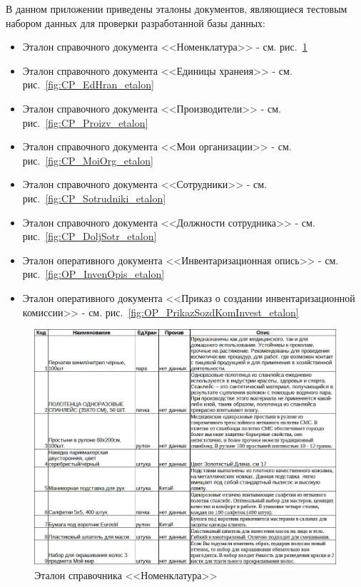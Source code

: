 \documentclass[12pt, a4paper, simple]{eskdtext}
\begin{document}
    

    \thispagestyle{plain}
    \pagestyle{plain}
    \hspace{0pt}

    В данном приложении приведены эталоны документов,
    являющиеся тестовым набором данных для проверки разработанной базы данных:

    \begin{itemize}
        \item Эталон справочного документа <<Номенклатура>> - см. рис.~\ref{fig:CP_Nomenclatura_etalon}
        \item Эталон справочного документа <<Единицы хранеия>> - см. рис.~\ref{fig:CP_EdHran_etalon}
        \item Эталон справочного документа <<Производители>> - см. рис.~\ref{fig:CP_Proizv_etalon}
        \item Эталон справочного документа <<Мои организации>> - см. рис.~\ref{fig:CP_MoiOrg_etalon}
        \item Эталон справочного документа <<Сотрудники>> - см. рис.~\ref{fig:CP_Sotrudniki_etalon}
        \item Эталон справочного документа <<Должности сотрудника>> - см. рис.~\ref{fig:CP_DoljSotr_etalon}
        \item Эталон оперативного документа <<Инвентаризационная опись>> - см. рис.~\ref{fig:OP_InvenOpis_etalon}
        \item Эталон оперативного документа <<Приказ о создании инвентаризационной комиссии>> - см. рис.~\ref{fig:OP_PrikazSozdKomInvest_etalon}
    \end{itemize}

    \begin{figure}[!h]
        \centering
        \includegraphics[width=18cm]
            {_docs/СП_Номенкл_эталон.jpg}
        \caption{Эталон справочника <<Номенклатура>>}
        \label{fig:CP_Nomenclatura_etalon}
    \end{figure}
    
\end{document}
